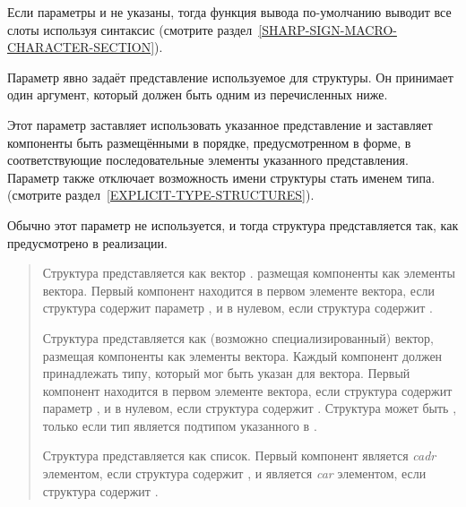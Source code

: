 \begin{flushdesc}
  Если параметры  и  не указаны, тогда
  функция вывода по-умолчанию выводит все слоты используя синтаксис
   (смотрите раздел~\ref{SHARP-SIGN-MACRO-CHARACTER-SECTION}).

\item[\cd{:type}] Параметр  явно задаёт представление
  используемое для структуры. Он принимает один аргумент, который
  должен быть одним из перечисленных ниже.

  Этот параметр заставляет использовать указанное представление и заставляет
  компоненты быть размещёнными в порядке, предусмотренном в 
  форме, в соответствующие последовательные элементы указанного представления.
  Параметр также отключает возможность имени структуры стать именем типа.
  (смотрите раздел~\ref{EXPLICIT-TYPE-STRUCTURES}).

  Обычно этот параметр не используется, и тогда структура представляется так,
  как предусмотрено в реализации.

  \begin{quotation} %
    \begin{flushdesc}

    \item[\cdf{vector}] Структура представляется как вектор . размещая компоненты как элементы вектора. Первый компонент
      находится в первом элементе вектора, если структура содержит параметр
      , и в нулевом, если структура содержит .

    \item[\cd{(vector \emph{element-type})}] Структура представляется как
      (возможно специализированный) вектор, размещая компоненты как элементы
      вектора. Каждый компонент должен принадлежать типу, который мог быть
      указан для вектора. Первый компонент находится в первом элементе вектора,
      если структура содержит параметр , и в нулевом, если структура
      содержит .  Структура может быть , только если тип
       является подтипом указанного в .

    \item[\cdf{list}] Структура представляется как список.  Первый компонент
      является \emph{cadr} элементом, если структура содержит , и
      является \emph{car} элементом, если структура содержит .
    \end{flushdesc}
  \end{quotation}


\end{flushdesc}
